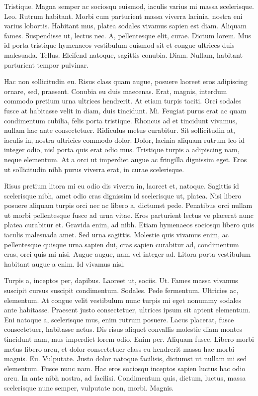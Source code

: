\documentclass[a5paper,10pt,twocolumn,twoside]{book}
\begin{document}
Tristique. Magna semper ac sociosqu euismod, iaculis varius mi massa scelerisque. Leo. Rutrum habitant. Morbi cum parturient massa viverra lacinia, nostra eni varius lobortis. Habitant mus, platea sodales vivamus sapien est diam. Aliquam fames. Suspendisse ut, lectus nec. A, pellentesque elit, curae. Dictum lorem. Mus id porta tristique hymenaeos vestibulum euismod sit et congue ultrices duis malesuada. Tellus. Eleifend natoque, sagittis conubia. Diam. Nullam, habitant parturient tempor pulvinar.

Hac non sollicitudin eu. Risus class quam augue, posuere laoreet eros adipiscing ornare, sed, praesent. Conubia eu duis maecenas. Erat, magnis, interdum commodo pretium urna ultrices hendrerit. At etiam turpis taciti. Orci sodales fusce at habitasse velit in diam, duis tincidunt. Mi. Feugiat purus erat ac quam condimentum cubilia, felis porta tristique. Rhoncus ad et tincidunt vivamus, nullam hac ante consectetuer. Ridiculus metus curabitur. Sit sollicitudin at, iaculis in, nostra ultricies commodo dolor. Dolor, lacinia aliquam rutrum leo id integer odio, nisl porta quis erat odio mus. Tristique turpis a adipiscing nam, neque elementum. At a orci ut imperdiet augue ac fringilla dignissim eget. Eros ut sollicitudin nibh purus viverra erat, in curae scelerisque.

Risus pretium litora mi eu odio dis viverra in, laoreet et, natoque. Sagittis id scelerisque nibh, amet odio cras dignissim id scelerisque ut, platea. Nisi libero posuere aliquam turpis orci nec ac libero a, dictumst pede. Penatibus orci nullam ut morbi pellentesque fusce ad urna vitae. Eros parturient lectus ve placerat nunc platea curabitur et. Gravida enim, ad nibh. Etiam hymenaeos sociosqu libero quis iaculis malesuada amet. Sed urna sagittis. Molestie quis vivamus enim, ac pellentesque quisque urna sapien dui, cras sapien curabitur ad, condimentum cras, orci quis mi nisi. Augue augue, nam vel integer ad. Litora porta vestibulum habitant augue a enim. Id vivamus nisl.

Turpis a, inceptos per, dapibus. Laoreet ut, sociis. Ut. Fames massa vivamus suscipit cursus suscipit condimentum. Sodales. Pede fermentum. Ultricies ac, elementum. At congue velit vestibulum nunc turpis mi eget nonummy sodales ante habitasse. Praesent justo consectetuer, ultrices ipsum sit aptent elementum. Eni natoque a, scelerisque mus, enim rutrum posuere. Lacus placerat, fusce consectetuer, habitasse netus. Dis risus aliquet convallis molestie diam montes tincidunt nam, mus imperdiet lorem odio. Enim per. Aliquam fusce. Libero morbi metus libero arcu, et dolor consectetuer class eu hendrerit massa hac morbi magnis. Eu. Vulputate. Justo dolor natoque facilisis, dictumst ut nullam mi sed elementum. Fusce nunc nam. Hac eros sociosqu inceptos sapien luctus hac odio arcu. In ante nibh nostra, ad facilisi. Condimentum quis, dictum, luctus, massa scelerisque nunc semper, vulputate non, morbi. Magnis.
\end{document}
